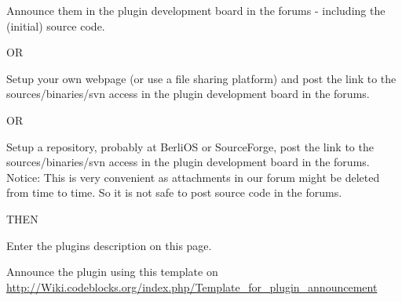 \tab Announce them in the plugin development board in the forums - including the (initial) source code.

OR

\tab Setup your own webpage (or use a file sharing platform) and post the link to the sources/binaries/svn access in the plugin development board in the forums.

OR

\tab Setup a repository, probably at BerliOS or SourceForge, post the link to the sources/binaries/svn access in the plugin development board in the forums. Notice: This is very convenient as attachments in our forum might be deleted from time to time. So it is not safe to post source code in the forums.

THEN

\tab Enter the plugins description on this page.

\tab Announce the plugin using this template on \url{http://Wiki.codeblocks.org/index.php/Template_for_plugin_announcement}

\begin{ASTYLE}

\end{ASTYLE}

\begin{AUTOVERSIONING}

\end{AUTOVERSIONING}

\begin{BROWSETRACKS}

\end{BROWSETRACKS}

\begin{CODESNIPPETS}

\end{CODESNIPPETS}

\begin{DOXYBLOCKS}

\end{DOXYBLOCKS}

\begin{EDITORTWEAKS}

\end{EDITORTWEAKS}

\begin{FILEMANAGER}

\end{FILEMANAGER}

\begin{HEXEDITOR}

\end{HEXEDITOR}

\begin{INCREMENTALSEARCH}

\end{INCREMENTALSEARCH}

